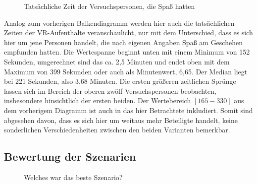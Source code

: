 \documentclass{Paper}
\begin{document}
                \begin{figure}[H]
  \caption{Tatsächliche Zeit der Versuchspersonen, die Spaß hatten}
  \label{ZeitSpass}
        \end{figure}
        Analog zum vorherigen Balkendiagramm werden hier auch die tatsächlichen Zeiten der VR-Aufenthalte veranschaulicht, nur mit dem Unterschied, dass es sich hier um jene Personen handelt, die nach eigenen Angaben Spaß am Geschehen empfunden hatten.
Die Wertespanne beginnt unten mit einem Minimum von 152 Sekunden, umgerechnet sind das ca. 2,5 Minuten und endet oben mit dem Maximum von 399 Sekunden oder auch als Minutenwert, 6,65. Der Median liegt bei 221 Sekunden, also 3,68 Minuten. Die ersten größeren zeitlichen Sprünge lassen sich im Bereich der oberen zwölf Versuchspersonen beobachten, insbesondere hinsichtlich der ersten beiden. Der Wertebereich $[165-330]$ aus dem vorherigem Diagramm ist auch in das hier Betrachtete inkludiert. Somit sind abgesehen davon, dass es sich hier um weitaus mehr Beteiligte handelt, keine sonderlichen Verschiedenheiten zwischen den beiden Varianten bemerkbar.
       
\newpage

\subsection{Bewertung der Szenarien}
        \begin{figure}[ht]
\caption{Welches war das beste Szenario?}
\label{SzenarioGut}
\end{figure}
\end{document}
